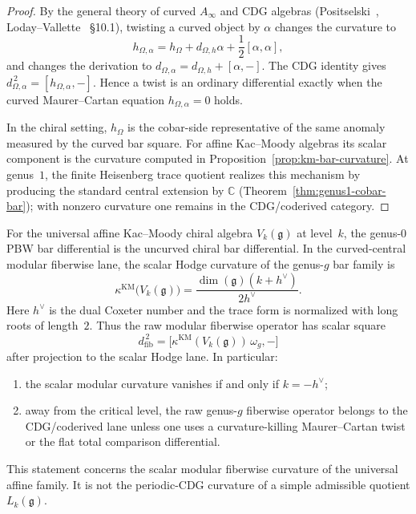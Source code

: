 \begin{proof}
By the general theory of curved $A_\infty$ and CDG algebras
(Positselski~\cite{Positselski11}, Loday--Vallette~\cite{LV12}
\S10.1), twisting a curved object by $\alpha$ changes the curvature to
\[
h_{\Omega,\alpha}
=h_\Omega+d_{\Omega,h}\alpha+\frac{1}{2}[\alpha,\alpha],
\]
and changes the derivation to
$d_{\Omega,\alpha}=d_{\Omega,h}+[\alpha,-]$. The CDG identity gives
$d_{\Omega,\alpha}^{\,2}=[h_{\Omega,\alpha},-]$. Hence a twist is an
ordinary differential exactly when the curved Maurer--Cartan equation
$h_{\Omega,\alpha}=0$ holds.

In the chiral setting, $h_\Omega$ is the cobar-side representative of
the same anomaly measured by the curved bar square. For affine
  Kac--Moody algebras its scalar component is the curvature computed in
  Proposition~\ref{prop:km-bar-curvature}. At genus~$1$, the finite
  Heisenberg trace quotient realizes this mechanism by producing the
  standard central extension by $\mathbb{C}$
  (Theorem~\ref{thm:genus1-cobar-bar}); with nonzero curvature one remains
  in the CDG/coderived category.
\end{proof}

\begin{proposition}
\label{prop:km-bar-curvature}
For the universal affine Kac--Moody chiral algebra
$V_k(\mathfrak g)$ at level~$k$, the genus-$0$ PBW bar differential is
the uncurved chiral bar differential. In the curved-central modular
fiberwise lane, the scalar Hodge curvature of the genus-$g$ bar family is
\begin{equation}\label{eq:km-curvature-part1}
\kappa^{\mathrm{KM}}\!\bigl(V_k(\mathfrak g)\bigr)
=\frac{\dim(\mathfrak g)(k+h^\vee)}{2h^\vee}.
\end{equation}
Here $h^\vee$ is the dual Coxeter number and the trace form is
normalized with long roots of length~$2$. Thus the raw modular
fiberwise operator has scalar square
\[
d_{\mathrm{fib}}^{\,2}
=\bigl[\kappa^{\mathrm{KM}}(V_k(\mathfrak g))\,\omega_g,-\bigr]
\]
after projection to the scalar Hodge lane. In particular:
\begin{enumerate}[label=\textup{(\roman*)}]
\item the scalar modular curvature vanishes if and only if
$k=-h^\vee$;
\item away from the critical level, the raw genus-$g$ fiberwise
operator belongs to the CDG/coderived lane unless one uses a
curvature-killing Maurer--Cartan twist or the flat total comparison
differential.
\end{enumerate}
This statement concerns the scalar modular fiberwise curvature of the
universal affine family. It is not the periodic-CDG curvature of a
simple admissible quotient $L_k(\mathfrak g)$.
\end{proposition}

